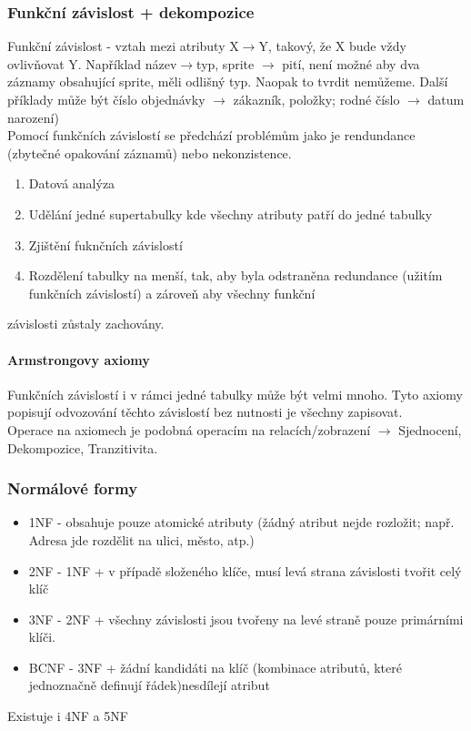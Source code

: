 \documentclass[10pt,a4paper]{article}
\begin{document}
\subsubsection{Funkční závislost + dekompozice}
Funkční závislost - vztah mezi atributy X$\rightarrow$Y, takový, že X bude vždy ovlivňovat Y. Například název$\rightarrow$typ, sprite $\rightarrow$ pití, není možné aby dva záznamy obsahující sprite, měli odlišný typ. Naopak to tvrdit nemůžeme. Další příklady může být číslo objednávky $\rightarrow$ zákazník, položky; rodné číslo $\rightarrow$ datum narození)\\
Pomocí funkčních závislostí se předchází problémům jako je rendundance (zbytečné opakování záznamů) nebo nekonzistence.
\begin{enumerate}
\item Datová analýza
\item Udělání jedné supertabulky kde všechny atributy patří do jedné tabulky
\item Zjištění fuknčních závislostí
\item Rozdělení tabulky na menší, tak, aby byla odstraněna redundance (užitím funkčních závislostí) a zároveň aby všechny funkční 
\end{enumerate}
závislosti zůstaly zachovány.
\paragraph{Armstrongovy axiomy}
Funkčních závislostí i v rámci jedné tabulky může být velmi mnoho. Tyto axiomy popisují odvozování těchto závislostí bez nutnosti je všechny zapisovat.\\
Operace na axiomech je podobná operacím na relacích/zobrazení $\rightarrow$ Sjednocení, Dekompozice, Tranzitivita.
\subsubsection{Normálové formy}
\begin{itemize}
\item 1NF - obsahuje pouze atomické atributy (žádný atribut nejde rozložit; např. Adresa jde rozdělit na ulici, město, atp.)
\item 2NF - 1NF + v případě složeného klíče, musí levá strana závislosti tvořit celý klíč
\item 3NF - 2NF + všechny závislosti jsou tvořeny na levé straně pouze primárními klíči.
\item BCNF - 3NF + žádní kandidáti na klíč (kombinace atributů, které jednoznačně definují řádek)nesdílejí atribut
\end{itemize}
Existuje i 4NF a 5NF
\end{document}

